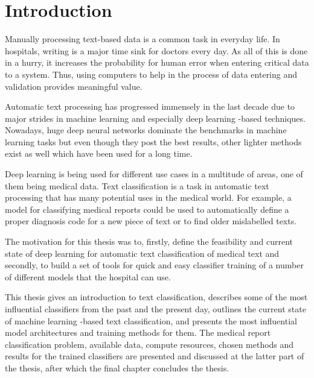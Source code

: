 \chapter{Introduction} \label{Introduction}

Manually processing text-based data is a common task in everyday life.
In hospitals, writing is a major time sink for doctors every day.
As all of this is done in a hurry, it increases the probability for human error when entering critical data to a system.
Thus, using computers to help in the process of data entering and validation provides meaningful value.

Automatic text processing has progressed immensely in the last decade due to major strides in machine learning and especially deep learning -based techniques.
Nowadays, huge deep neural networks dominate the benchmarks in machine learning tasks but even though they post the best results, other lighter methods exist as well which have been used for a long time.

Deep learning is being used for different use cases in a multitude of areas, one of them being medical data.
Text classification is a task in automatic text processing that has many potential uses in the medical world.
For example, a model for classifying medical reports could be used to automatically define a proper diagnosis code for a new piece of text or to find older mislabelled texts.

The motivation for this thesis was to, firstly, define the feasibility and current state of deep learning for automatic text classification of medical text and secondly, to build a set of tools for quick and easy classifier training of a number of different models that the hospital can use.

This thesis gives an introduction to text classification, describes some of the most influential classifiers from the past and the present day, outlines the current state of machine learning -based text classification, and presents the most influential model architectures and training methods for them.
The medical report classification problem, available data, compute resources, chosen methods and results for the trained classifiers are presented and discussed at the latter part of the thesis, after which the final chapter concludes the thesis.
